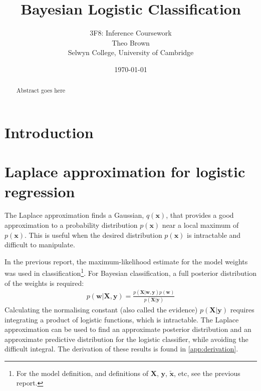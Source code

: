 \documentclass[a4paper]{article}
\begin{document}
    \title{Bayesian Logistic Classification}
    \author{3F8: Inference Coursework \\ Theo Brown \\ Selwyn College, University of Cambridge}
    \date{\today}
    \maketitle

    \begin{abstract}
        Abstract goes here
    \end{abstract}
    
    \section{Introduction}\label{sec:introduction}

    \section{Laplace approximation for logistic regression}
    The Laplace approximation finds a Gaussian, $q(\bm{x})$, that provides a good approximation to a probability distribution $p(\bm{x})$ near a local maximum of $p(\bm{x})$.
    This is useful when the desired distribution $p(\bm{x})$ is intractable and difficult to manipulate.

    In the previous report, the maximum-likelihood estimate for the model weights was used in classification\footnote{For the model definition, and definitions of $\bm{X}$, $\bm{y}$, $\tilde{\bm{x}}$, etc, see the previous report.}.
    For Bayesian classification, a full posterior distribution of the weights is required:
    \begin{align}
        p(\bm{w} | \bm{X}, \bm{y}) = \frac{p(\bm{X} | \bm{w}, \bm{y}) p(\bm w)}{p(\bm{X} | \bm{y})}
        \label{eq:posterior}
    \end{align}
    Calculating the normalising constant (also called the evidence) $p(\bm{X} | \bm{y})$ requires integrating a product of logistic functions, which is intractable.
    The Laplace approximation can be used to find an approximate posterior distribution and an approximate predictive distribution for the logistic classifier, while avoiding the difficult integral.
    The derivation of these results is found in \autoref{app:derivation}.
\end{document}
